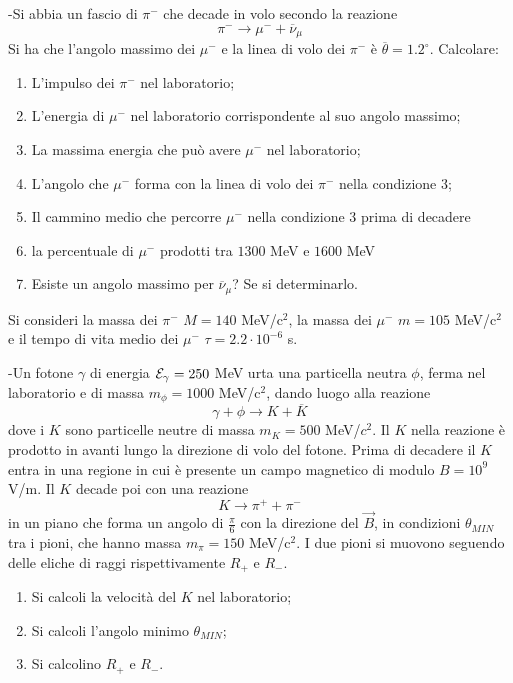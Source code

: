 \documentclass[12pt,twoside,a4]{article}
\begin{document}
\newpage
\begin{esercizio}[Esame 04/02/2014]
	-Si abbia un fascio di $\pi^-$ che decade in volo secondo la reazione
$$ \pi^- \longrightarrow \mu^- + \overline{\nu}_\mu $$
Si ha che l'angolo massimo dei $\mu^-$ e la linea di volo dei $\pi^-$ è $\overline{\theta} = 1.2^\circ$. 
Calcolare:
\begin{enumerate}[label=(\textit{\roman*})]
\item L'impulso dei $\pi^-$ nel laboratorio;
\item L'energia di $\mu^-$ nel laboratorio corrispondente al suo angolo massimo;
\item La massima energia che può avere $\mu^-$ nel laboratorio;
\item L'angolo che $\mu^-$ forma con la linea di volo dei $\pi^-$ nella condizione $3$;
\item Il cammino medio che percorre $\mu^-$ nella condizione $3$ prima di decadere
\item la percentuale di $\mu^-$ prodotti tra $1300$ MeV e $1600$ MeV
\item Esiste un angolo massimo per $\overline{\nu}_\mu$? Se si determinarlo.
\end{enumerate}
Si consideri la massa dei $\pi^-$ $M = 140$ MeV/c$^2$, la massa dei $\mu^-$ $m=105$ MeV/c$^2$ e il tempo di vita medio dei $\mu^-$ $\tau = 2.2 \cdot 10^{-6}$ s.
\end{esercizio}

\begin{esercizio}[Esame 15/07/2013]
	-Un fotone $\gamma$ di energia $\mathcal{E}_\gamma = 250$ MeV urta una particella neutra $\phi$, ferma nel laboratorio e di massa $m_\phi = 1000$ MeV/c$^2$, dando luogo alla reazione 
$$ \gamma + \phi \longrightarrow K + \overline{K}$$ 
dove i $K$ sono particelle neutre di massa $m_K = 500$ MeV/$c^2$. Il $K$ nella reazione è prodotto in avanti lungo la direzione di volo del fotone. Prima di decadere il $K$ entra in una regione in cui è presente un campo magnetico di modulo $B = 10^9 $ V/m. Il $K$ decade poi con una reazione
$$ K \longrightarrow \pi^+ + \pi^- $$
in un piano che forma un angolo di $\frac{\pi}{6}$ con la direzione del $\vec{B}$, in condizioni $\theta_{MIN}$ tra i pioni, che hanno massa $m_\pi = 150$ MeV/c$^2$. I due pioni si muovono seguendo delle eliche di raggi rispettivamente $R_+$ e $R_-$.
\begin{enumerate}[label=(\textit{\roman*})]
\item Si calcoli la velocità  del $K$ nel laboratorio;
\item Si calcoli l'angolo minimo $\theta_{MIN}$;
\item Si calcolino $R_+$ e $R_-$.
\end{enumerate}
\end{esercizio}
\end{document}
